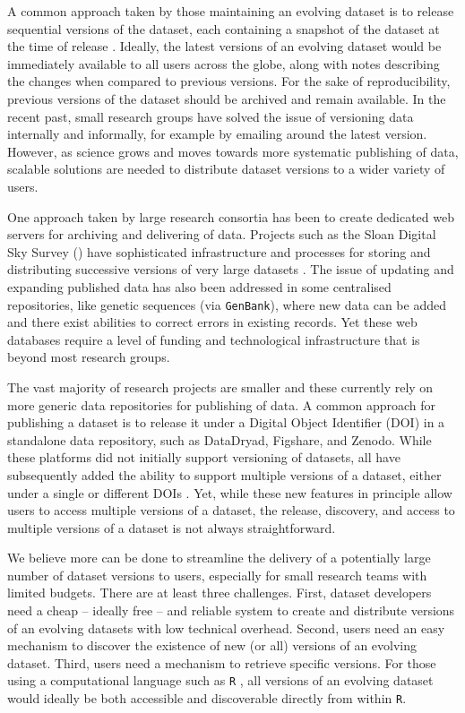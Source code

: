 \documentclass[a4paper,num-refs]{assets/oup-contemporary}
\begin{document}
A common approach taken by those maintaining an evolving dataset is to release sequential versions of the dataset, each containing a snapshot of the dataset at the time of release \cite[e.g.][]{Falster-2015, Pennell-2015a, Yenni-2018, Abolfathi-2018}. Ideally, the latest versions of an evolving dataset would be immediately available to all users across the globe, along with notes describing the changes when compared to previous versions. For the sake of reproducibility, previous versions of the dataset should be archived and remain available. In the recent past, small research groups have solved the issue of versioning data internally and informally, for example by emailing around the latest version. However, as science grows and moves towards more systematic publishing of data, scalable solutions are needed to distribute dataset versions to a wider variety of users.

One approach taken by large research consortia has been to create dedicated web servers for archiving and delivering of data. Projects such as the Sloan Digital Sky Survey () have sophisticated infrastructure and processes for storing and distributing successive versions of very large datasets \cite{Abolfathi-2018}. The issue of updating and expanding published data has also been addressed in some centralised repositories, like genetic sequences (via \texttt{GenBank}), where new data can be added and there exist abilities to correct errors in existing records. Yet these web databases require a level of funding and technological infrastructure that is beyond most research groups.

The vast majority of research projects are smaller and these currently rely on more generic data repositories for publishing of data. A common approach for publishing a dataset is to release it under a Digital Object Identifier (DOI) in a standalone data repository, such as DataDryad, Figshare, and Zenodo. While these platforms did not initially support versioning of datasets, all have subsequently added the ability to support multiple versions of a dataset, either under a single or different DOIs \cite{Nielsen-2017}. Yet, while these new features in principle allow users to access multiple versions of a dataset, the release, discovery, and access to multiple versions of a dataset is not always straightforward.

We believe more can be done to streamline the delivery of a potentially large number of dataset versions to users, especially for small research teams with limited budgets. There are at least three challenges. First, dataset developers need a cheap -- ideally free -- and reliable system  to create and distribute versions of an evolving datasets with low technical overhead. Second, users need an easy mechanism to discover the existence of new (or all) versions of an evolving dataset. Third, users need a mechanism to retrieve specific versions. For those using a computational language such as \texttt{R} \cite{R-2017}, all versions of an evolving dataset would ideally be both accessible and discoverable directly from within \texttt{R}.
\end{document}
